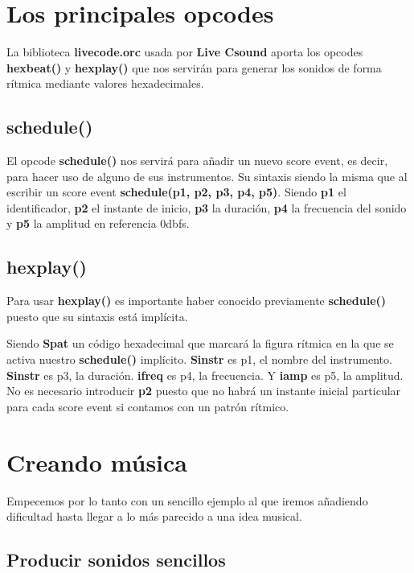 \section{Los principales opcodes}

La biblioteca \textbf{livecode.orc} usada por \textbf{Live Csound} aporta los opcodes \textbf{hexbeat()} y \textbf{hexplay()} que nos servirán para generar los sonidos de forma rítmica mediante valores hexadecimales.

\subsection{schedule()}

El opcode \textbf{schedule()} nos servirá para añadir un nuevo score event, es decir, para hacer uso de alguno de sus instrumentos. Su sintaxis siendo la misma que al escribir un score event \textbf{schedule(p1, p2, p3, p4, p5)}. Siendo \textbf{p1} el identificador, \textbf{p2} el instante de inicio, \textbf{p3} la duración, \textbf{p4} la frecuencia del sonido y \textbf{p5} la amplitud en referencia 0dbfs.

\subsection{hexplay()}

Para usar \textbf{hexplay()} es importante haber conocido previamente \textbf{schedule()} puesto que su sintaxis está implícita.  

 
Siendo \textbf{Spat} un código hexadecimal que marcará la figura rítmica en la que se activa nuestro \textbf{schedule()} implícito. \textbf{Sinstr} es p1, el nombre del instrumento. \textbf{Sinstr} es p3, la duración. \textbf{ifreq} es p4, la frecuencia. Y \textbf{iamp} es p5, la amplitud. No es necesario introducir \textbf{p2} puesto que no habrá un instante inicial particular para cada score event si contamos con un patrón rítmico.

\section{Creando música}

Empecemos por lo tanto con un sencillo ejemplo al que iremos añadiendo dificultad hasta llegar a lo más parecido a una idea musical.

\subsection{Producir sonidos sencillos}

